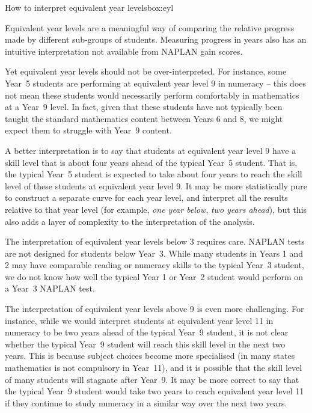 \begin{bigparbox*}{How to interpret equivalent year levels}{box:eyl}
\raggedright

Equivalent year levels are a meaningful way of comparing the relative progress made by different sub-groups of students. Measuring progress in years also has an intuitive interpretation not available from NAPLAN gain scores.

Yet equivalent year levels should not be over-interpreted. For instance, some \mbox{Year 5} students are performing at equivalent year level 9 in numeracy -- this does not mean these students would necessarily perform comfortably in mathematics at a \mbox{Year 9} level. In fact, given that these students have not typically been taught the standard mathematics content between Years 6 and 8, we might expect them to struggle with \mbox{Year 9} content.

A better interpretation is to say that students at equivalent year level 9 have a skill level that is about four years ahead of the typical \mbox{Year 5} student. That is, the typical \mbox{Year 5} student is expected to take about four years to reach the skill level of these students at equivalent year level 9. It may be more statistically pure to construct a separate curve for each year level, and interpret all the results relative to that year level (for example, \textit{one year below}, \textit{two years ahead}), but this also adds a layer of complexity to the interpretation of the analysis.

The interpretation of equivalent year levels below 3 requires care. NAPLAN tests are not designed for students below \mbox{Year 3}. While many students in Years 1 and 2 may have comparable reading or numeracy skills to the typical \mbox{Year 3} student, we do not know how well the typical Year 1 or \mbox{Year 2} student would perform on a \mbox{Year 3} NAPLAN test. 

The interpretation of equivalent year levels above 9 is even more challenging. For instance, while we would interpret students at equivalent year level 11 in numeracy to be two years ahead of the typical \mbox{Year 9} student, it is not clear whether the typical \mbox{Year 9} student will reach this skill level in the next two years. This is because subject choices become more specialised (in many states mathematics is not compulsory in \mbox{Year 11}), and it is possible that the skill level of many students will stagnate after \mbox{Year 9}. It may be more correct to say that the typical \mbox{Year 9} student would take two years to reach equivalent year level 11 if they continue to study numeracy in a similar way over the next two years.


\end{bigparbox*}
